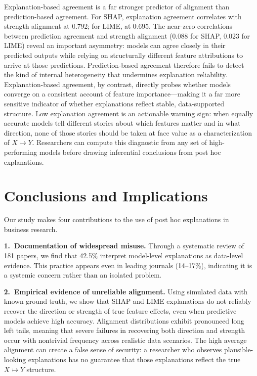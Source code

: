 \documentclass[11pt]{article}
\begin{document}
Explanation-based agreement is a far stronger predictor of alignment than prediction-based agreement. For SHAP, explanation agreement correlates with strength alignment at 0.792; for LIME, at 0.695. The near-zero correlations between prediction agreement and strength alignment (0.088 for SHAP, 0.023 for LIME) reveal an important asymmetry: models can agree closely in their predicted outputs while relying on structurally different feature attributions to arrive at those predictions. Prediction-based agreement therefore fails to detect the kind of internal heterogeneity that undermines explanation reliability. Explanation-based agreement, by contrast, directly probes whether models converge on a consistent account of feature importance---making it a far more sensitive indicator of whether explanations reflect stable, data-supported structure. Low explanation agreement is an actionable warning sign: when equally accurate models tell different stories about which features matter and in what direction, none of those stories should be taken at face value as a characterization of $X \mapsto Y$. Researchers can compute this diagnostic from any set of high-performing models before drawing inferential conclusions from post hoc explanations.

\section{Conclusions and Implications}

Our study makes four contributions to the use of post hoc explanations in business research.

\noindent\textbf{1.\ Documentation of widespread misuse.} Through a systematic review of 181 papers, we find that 42.5\% interpret model-level explanations as data-level evidence. This practice appears even in leading journals (14--17\%), indicating it is a systemic concern rather than an isolated problem. %

\noindent\textbf{2.\ Empirical evidence of unreliable alignment.} Using simulated data with known ground truth, we show that SHAP and LIME explanations do not reliably recover the direction or strength of true feature effects, even when predictive models achieve high accuracy. Alignment distributions exhibit pronounced long left tails, meaning that severe failures in recovering both direction and strength occur with nontrivial frequency across realistic data scenarios. The high average alignment can create a false sense of security: a researcher who observes plausible-looking explanations has no guarantee that those explanations reflect the true $X \mapsto Y$ structure.
\end{document}
